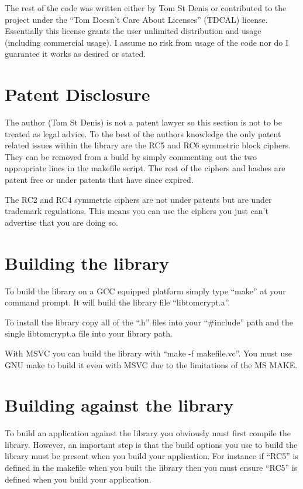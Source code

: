 \documentclass{book}
\begin{document}
The rest of the code was written either by Tom St Denis or contributed to the project under the ``Tom Doesn't Care
About Licenses'' (TDCAL) license.  Essentially this license grants the user unlimited distribution and usage (including
commercial usage).  I assume no risk from usage of the code nor do I guarantee it works as desired or stated.  

\section{Patent Disclosure}

The author (Tom St Denis) is not a patent lawyer so this section is not to be treated as legal advice.  To the best
of the authors knowledge the only patent related issues within the library are the RC5 and RC6 symmetric block ciphers.  
They can be removed from a build by simply commenting out the two appropriate lines in the makefile script.  The rest
of the ciphers and hashes are patent free or under patents that have since expired.

The RC2 and RC4 symmetric ciphers are not under patents but are under trademark regulations.  This means you can use 
the ciphers you just can't advertise that you are doing so.  

\section{Building the library}

To build the library on a GCC equipped platform simply type ``make'' at your command prompt.  It will build the library
file ``libtomcrypt.a''.  

To install the library copy all of the ``.h'' files into your ``\#include'' path and the single libtomcrypt.a file into 
your library path.

With MSVC you can build the library with ``make -f makefile.vc''.  You must use GNU make to build it even with MSVC
due to the limitations of the MS MAKE.

\section{Building against the library}

To build an application against the library you obviously must first compile the library.  However, an important 
step is that the build options you use to build the library must be present when you build your application.  For 
instance if ``RC5'' is defined in the makefile when you built the library then you must ensure ``RC5'' is defined when
you build your application.
\end{document}
